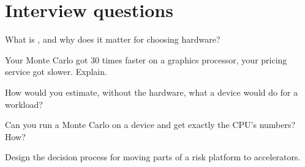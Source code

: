 \section{Interview questions}

\begin{interviewq}\label{iq:pl:accelerators-for-quantitative-work:1}
What is , and why does it matter for choosing hardware?
\end{interviewq}

\begin{interviewq}\label{iq:pl:accelerators-for-quantitative-work:2}
Your Monte Carlo got 30 times faster on a graphics processor, your pricing service got slower. Explain.
\end{interviewq}

\begin{interviewq}\label{iq:pl:accelerators-for-quantitative-work:3}
How would you estimate, without the hardware, what a device would do for a workload?
\end{interviewq}

\begin{interviewq}\label{iq:pl:accelerators-for-quantitative-work:4}
Can you run a Monte Carlo on a device and get exactly the CPU's numbers? How?
\end{interviewq}

\begin{interviewq}\label{iq:pl:accelerators-for-quantitative-work:5}
Design the decision process for moving parts of a risk platform to accelerators.
\end{interviewq}
